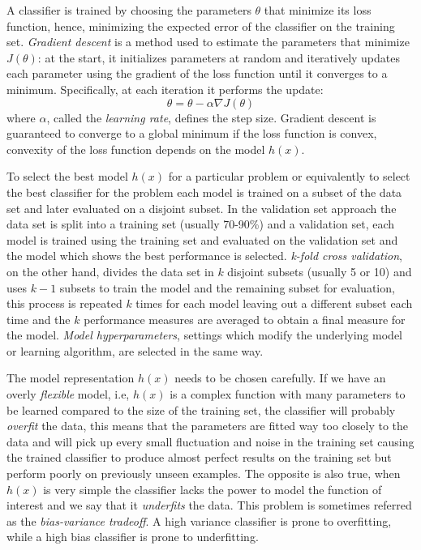 A classifier is trained by choosing the parameters $\theta$ that minimize its loss function, hence, minimizing the expected error of the classifier on the training set. \emph{Gradient descent} is a method used to estimate the parameters that minimize $J(\theta)$: at the start, it initializes parameters at random and iteratively updates each parameter using the gradient of the loss function until it converges to a minimum. Specifically, at each iteration it performs the update:
\begin{equation}
	\theta = \theta - \alpha \nabla{J(\theta)}
\end{equation}
where $\alpha$, called the \emph{learning rate}, defines the step size. Gradient descent is guaranteed to converge to a global minimum if the loss function is convex, convexity of the loss function depends on the model $h(x)$.

To select the best model $h(x)$ for a particular problem or equivalently to select the best classifier for the problem each model is trained on a subset of the data set and later evaluated on a disjoint subset. In the {validation set approach} the data set is split into a training set (usually 70-90\%) and a validation set, each model is trained using the training set and evaluated on the validation set and the model which shows the best performance is selected. \emph{k-fold cross validation}, on the other hand, divides the data set in $k$ disjoint subsets (usually 5 or 10) and uses $k-1$ subsets to train the model and the remaining subset for evaluation, this process is repeated $k$ times for each model leaving out a different subset each time and the $k$ performance measures are averaged to obtain a final measure for the model.
\emph{Model hyperparameters}, settings which modify the underlying model or learning algorithm, are selected in the same way.

The model representation $h(x)$ needs to be chosen carefully. If we have an overly \emph{flexible} model, i.e, $h(x)$ is a complex function with many parameters to be learned compared to the size of the training set, the classifier will probably \emph{overfit} the data, this means that the parameters are fitted way too closely to the data and will pick up every small fluctuation and noise in the training set causing the trained classifier to produce almost perfect results on the training set but perform poorly on previously unseen examples. The opposite is also true, when $h(x)$ is very simple the classifier lacks the power to model the function of interest and we say that it \emph{underfits} the data. This problem is sometimes referred as the \emph{bias-variance tradeoff}. A high variance classifier is prone to overfitting, while a high bias classifier is prone to underfitting.

